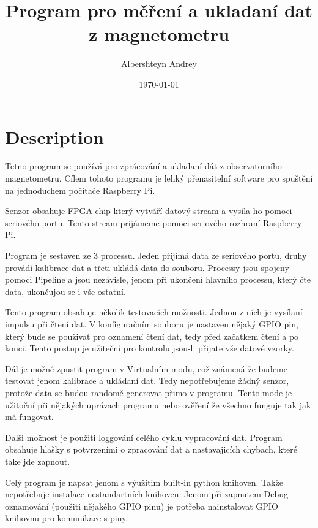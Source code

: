 \documentclass[12pt]{article}
\title{Program pro měření a ukladaní dat z magnetometru}
\author{Albershteyn Andrey}
\date{\today}
\begin{document}
\maketitle

\renewcommand*\contentsname{Obsah}
\tableofcontents
\section{Description}
\par Tetno program se používá pro zprácování a ukladaní dát z observatorního
magnetometru. Cílem tohoto programu je lehký přenasitelní software pro spuštění
na jednoduchem počítače Raspberry Pi. 
\newline
\par Senzor obsahuje FPGA chip který vytváří datový stream a vysíla ho pomoci
seriového portu. Tento stream prijámeme pomoci seriového rozhraní Raspberry Pi.
\newline
\par Program je sestaven ze 3 processu. Jeden přijímá data ze seriového portu,
druhy provádí kalibrace dat a třeti ukládá data do souboru. Processy jsou
spojeny pomoci Pipeline a jsou nezávisle, jenom při ukončení hlavního processu,
který čte data, ukončujou se i vše ostatní.
\newline
\par Tento program obsahuje několik testovacích možnosti. Jednou z ních je
vysílaní impulsu při čtení dat. V konfiguračním souboru je nastaven nějaký GPIO
pin, který bude se použivat pro oznamení čtení dat, tedy před začatkem čtení a
po konci. Tento postup je užiteční pro kontrolu jsou-li přijate vše datové
vzorky.
\par Dál je možné zpustit program v Virtualním modu, což známená že budeme
testovat jenom kalibrace a ukládaní dat. Tedy nepotřebujeme žádný senzor,
protože data se budou randomě generovat přimo v programu. Tento mode je užitoční
při nějakých uprávach programu nebo ověření že všechno funguje tak jak má
fungovat.
\par Dalši možnost je použiti loggování celého cyklu vypracování dat. Program
obsahuje hlašky s potvrzeními o zpracování dat a nastavajicích chybach, které
take jde zapnout.
\newline
\par Celý program je napsat jenom s výužitim built-in python knihoven.
Takže nepotřebuje instalace nestandartních knihoven. Jenom při zapnutem Debug
oznamování (použiti nějakého GPIO pinu) je potřeba nainstalovat GPIO knihovnu
pro komunikace s piny.
\end{document}
